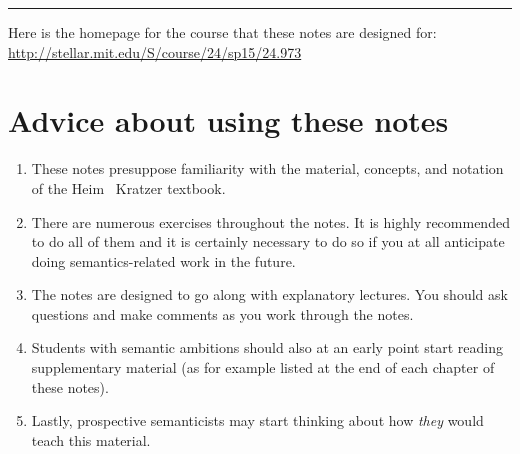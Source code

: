 \plainbreak{1} 

Here is the homepage for the course that these notes are designed for:\\[6pt]
\url{http://stellar.mit.edu/S/course/24/sp15/24.973}

\ab 
\vfill\null

\cleardoublepage

\null
\vfill \ba 

\section*{Advice about using these notes}
\begin{enumerate}
\item These notes presuppose familiarity with the material, concepts,
  and notation of the Heim \amp\ Kratzer textbook.
\item There are numerous exercises throughout the notes. It is highly
  recommended to do all of them and it is certainly necessary to do so
  if you at all anticipate doing semantics-related work in the future.
\item The notes are designed to go along with explanatory lectures.
  You should ask questions and make comments as you work through the
  notes.
\item Students with semantic ambitions should also at an early point
  start reading supplementary material (as for example listed at the
  end of each chapter of these notes).
\item Lastly, prospective semanticists may start thinking about how
  \emph{they} would teach this material.
\end{enumerate}

\ab 
\vfill\null

\newpage\hbox{}
\vfill{\scshape{}}
\vfill\hbox{}\thispagestyle{cleared}